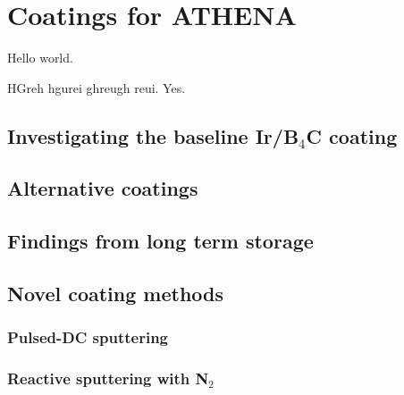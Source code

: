 \chapter{Coatings for ATHENA}
Hello world.

HGreh hgurei ghreugh reui.
Yes.
\section{Investigating the baseline Ir/B$_4$C coating}
\section{Alternative coatings}
\section{Findings from long term storage}
\section{Novel coating methods}
\subsection{Pulsed-DC sputtering}

\subsection{Reactive sputtering with N$_2$}
